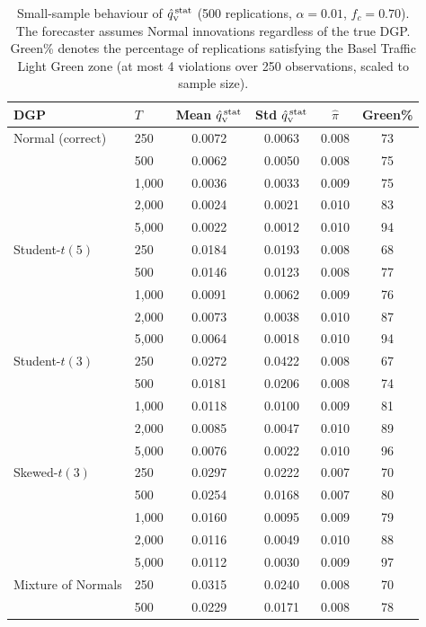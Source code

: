\begin{table}[H]
	\centering
	\caption{Small-sample behaviour of $\hat{q}_{\scriptscriptstyle\mathrm{V}}^{\,\mathrm{stat}}$ (500 replications, $\alpha=0.01$, $f_c=0.70$). The forecaster assumes Normal innovations regardless of the true DGP. Green\% denotes the percentage of replications satisfying the Basel Traffic Light Green zone (at most 4 violations over 250 observations, scaled to sample size).}
	\label{tab:small_sample_qV}
	\footnotesize
	\begin{tabular}{@{}llcccc@{}}
		\toprule
		DGP & $T$ & Mean $\hat{q}_{\scriptscriptstyle\mathrm{V}}^{\,\mathrm{stat}}$ & Std $\hat{q}_{\scriptscriptstyle\mathrm{V}}^{\,\mathrm{stat}}$ & $\hat\pi$ & Green\% \\
		\midrule
		Normal (correct)
		& 250   & 0.0072 & 0.0063 & 0.008 & 73 \\
		& 500   & 0.0062 & 0.0050 & 0.008 & 75 \\
		& 1,000   & 0.0036 & 0.0033 & 0.009 & 75 \\
		& 2,000   & 0.0024 & 0.0021 & 0.010 & 83 \\
		& 5,000   & 0.0022 & 0.0012 & 0.010 & 94 \\
		\addlinespace
		Student-$t(5)$
		& 250   & 0.0184 & 0.0193 & 0.008 & 68 \\
		& 500   & 0.0146 & 0.0123 & 0.008 & 77 \\
		& 1,000   & 0.0091 & 0.0062 & 0.009 & 76 \\
		& 2,000   & 0.0073 & 0.0038 & 0.010 & 87 \\
		& 5,000   & 0.0064 & 0.0018 & 0.010 & 94 \\
		\addlinespace
		Student-$t(3)$
		& 250   & 0.0272 & 0.0422 & 0.008 & 67 \\
		& 500   & 0.0181 & 0.0206 & 0.008 & 74 \\
		& 1,000   & 0.0118 & 0.0100 & 0.009 & 81 \\
		& 2,000   & 0.0085 & 0.0047 & 0.010 & 89 \\
		& 5,000   & 0.0076 & 0.0022 & 0.010 & 96 \\
		\addlinespace
		Skewed-$t(3)$
		& 250   & 0.0297 & 0.0222 & 0.007 & 70 \\
		& 500   & 0.0254 & 0.0168 & 0.007 & 80 \\
		& 1,000   & 0.0160 & 0.0095 & 0.009 & 79 \\
		& 2,000   & 0.0116 & 0.0049 & 0.010 & 88 \\
		& 5,000   & 0.0112 & 0.0030 & 0.009 & 97 \\
		\addlinespace
		Mixture of Normals
		& 250   & 0.0315 & 0.0240 & 0.008 & 70 \\
		& 500   & 0.0229 & 0.0171 & 0.008 & 78 \\

\end{tabular}
\end{table}
